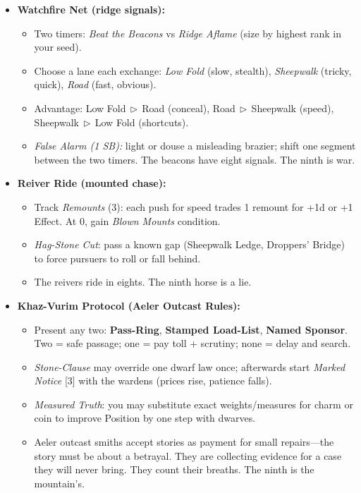 \begin{itemize}
  \item \textbf{Watchfire Net (ridge signals):}
  \begin{itemize}
    \item Two timers: \emph{Beat the Beacons} vs \emph{Ridge Aflame} (size by highest rank in your seed).
    \item Choose a lane each exchange: \emph{Low Fold} (slow, stealth), \emph{Sheepwalk} (tricky, quick), \emph{Road} (fast, obvious).
    \item Advantage: Low Fold\(\,\triangleright\,\)Road (conceal), Road\(\,\triangleright\,\)Sheepwalk (speed), Sheepwalk\(\,\triangleright\,\)Low Fold (shortcuts).
    \item \emph{False Alarm (1 SB):} light or douse a misleading brazier; shift one segment between the two timers. The beacons have eight signals. The ninth is war.
  \end{itemize}

  \item \textbf{Reiver Ride (mounted chase):}
  \begin{itemize}
    \item Track \emph{Remounts} (3): each push for speed trades 1 remount for +1d or +1 Effect. At 0, gain \emph{Blown Mounts} condition.
    \item \emph{Hag-Stone Cut}: pass a known gap (Sheepwalk Ledge, Droppers' Bridge) to force pursuers to roll or fall behind.
    \item The reivers ride in eights. The ninth horse is a lie.
  \end{itemize}

  \item \textbf{Khaz-Vurim Protocol (Aeler Outcast Rules):}
  \begin{itemize}
    \item Present any two: \textbf{Pass-Ring}, \textbf{Stamped Load-List}, \textbf{Named Sponsor}. Two = safe passage; one = pay toll + scrutiny; none = delay and search.
    \item \emph{Stone-Clause} may override one dwarf law once; afterwards start \emph{Marked Notice} [3] with the wardens (prices rise, patience falls).
    \item \emph{Measured Truth}: you may substitute exact weights/measures for charm or coin to improve Position by one step with dwarves.
    \item Aeler outcast smiths accept stories as payment for small repairs---the story must be about a betrayal. They are collecting evidence for a case they will never bring. They count their breaths. The ninth is the mountain's.
  \end{itemize}


\end{itemize}
